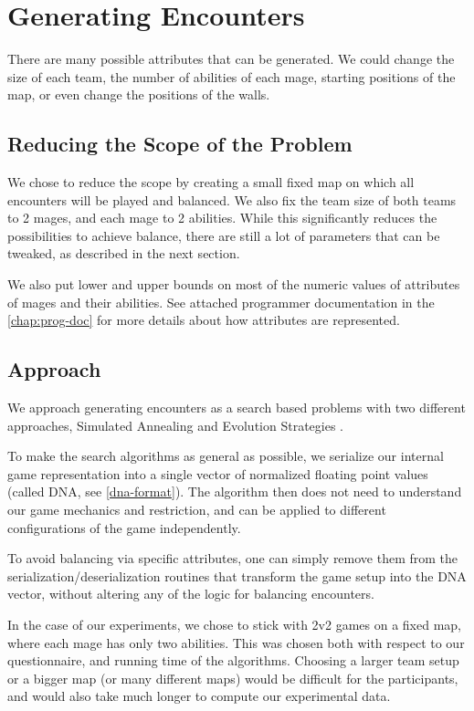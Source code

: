 \chapter{Generating Encounters}
\label{chapter04}

There are many possible attributes that can be generated. We could change the size of each team,
the number of abilities of each mage, starting positions of the map, or even change the positions of the walls.

\section{Reducing the Scope of the Problem}

We chose to reduce the scope by creating a small fixed map on which all encounters will be played and balanced.
We also fix the team size of both teams to 2 mages, and each mage to 2 abilities. While this significantly reduces
the possibilities to achieve balance, there are still a lot of parameters that can be tweaked, as described in the next section.

We also put lower and upper bounds on most of the numeric values of attributes of mages and their abilities. See attached programmer documentation in the \autoref{chap:prog-doc} for more details about how attributes are represented.

\section{Approach}

We approach generating encounters as a search based problems with two different
approaches, Simulated Annealing \citep{ai-modern} and Evolution Strategies
\citep{evolution-strategies}.

To make the search algorithms as general as possible, we serialize our
internal game representation into a single vector of normalized floating
point values (called DNA, see \autoref{dna-format}). The algorithm then does not need to understand our game
mechanics and restriction, and can be applied to different configurations of
the game independently.

To avoid balancing via specific attributes, one can simply remove them from
the serialization/deserialization routines that transform the game setup into
the DNA vector, without altering any of the logic for balancing encounters.

In the case of our experiments, we chose to stick with 2v2 games on a fixed map,
where each mage has only two abilities. This was chosen both with respect to our
questionnaire, and running time of the algorithms. Choosing a larger team setup or
a bigger map (or many different maps) would be difficult for the participants,
and would also take much longer to compute our experimental data.

